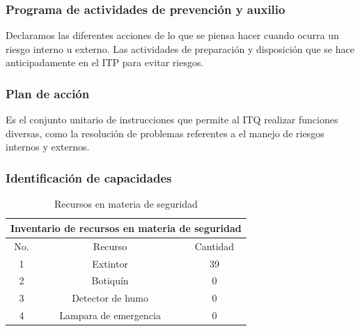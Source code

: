 \subsubsection{Programa de actividades de prevención y auxilio}

Declaramos las diferentes acciones de lo que se piensa hacer cuando ocurra un riesgo interno u externo. 
Las actividades de preparación y disposición que se hace anticipadamente en el ITP para evitar riesgos.
% 
% 
\subsubsection{Plan de acción}

Es el conjunto unitario de instrucciones que permite al ITQ realizar funciones diversas, como la resolución de problemas referentes a el manejo de riesgos internos y externos.
%
%
\subsubsection{Identificación de capacidades}

\begin{table}[H]
    \centering
    \caption{Recursos en materia de seguridad}
    \begin{tabular}{c c c}
    \hline
    \multicolumn{3}{c}{Inventario de recursos en materia de seguridad}\\
    \hline
         No.& Recurso & Cantidad  \\
    \hline
         1& Extintor & 39  \\
    \hline
         2& Botiquín & 0  \\
    \hline
         3& Detector de humo & 0 \\
    \hline
         4& Lampara de emergencia & 0 \\
    \hline     
    \end{tabular}
    \label{tab:inventario}
\end{table}
%
%
